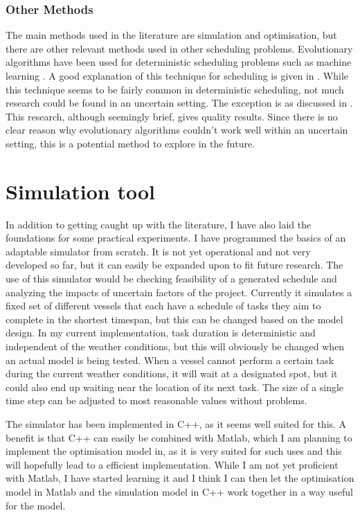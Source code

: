 \documentclass[a4paper,12pt]{article}
\begin{document}
\subsubsection{Other Methods} \label{ss:otmet}
The main methods used in the literature are simulation and optimisation, but there are other relevant methods used in other scheduling problems. Evolutionary algorithms have been used for deterministic scheduling problems such as machine learning \cite{dorndorf1995evolution}. A good explanation of this technique for scheduling is given in \cite{cotta2007memetic}. While this technique seems to be fairly common in deterministic scheduling, not much research could be found in an uncertain setting. The exception is \cite{sevaux2002genetic} as discussed in . This research, although seemingly brief, gives quality results. Since there is no clear reason why evolutionary algorithms couldn't work well within an uncertain setting, this is a potential method to explore in the future. 


\pagebreak

\section{Simulation tool} \label{s:sim}
In addition to getting caught up with the literature, I have also laid the foundations for some practical experiments. I have programmed the basics of an adaptable simulator from scratch. It is not yet operational and not very developed so far, but it can easily be expanded upon to fit future research. The use of this simulator would be checking feasibility of a generated schedule and analyzing the impacts of uncertain factors of the project. Currently it simulates a fixed set of different vessels that each have a schedule of tasks they aim to complete in the shortest timespan, but this can be changed based on the model design. In my current implementation, task duration is deterministic and independent of the weather conditions, but this will obviously be changed when an actual model is being tested. When a vessel cannot perform a certain task during the current weather conditions, it will wait at a designated spot, but it could also end up waiting near the location of its next task. The size of a single time step can be adjusted to most reasonable values without problems. 

The simulator has been implemented in C++, as it seems well suited for this. A benefit is that C++ can easily be combined with Matlab, which I am planning to implement the optimisation model in, as it is very suited for such uses and this will hopefully lead to a efficient implementation. While I am not yet proficient with Matlab, I have started learning it and I think I can then let the optimisation model in Matlab and the simulation model in C++ work together in a way useful for the model. 
\end{document}
